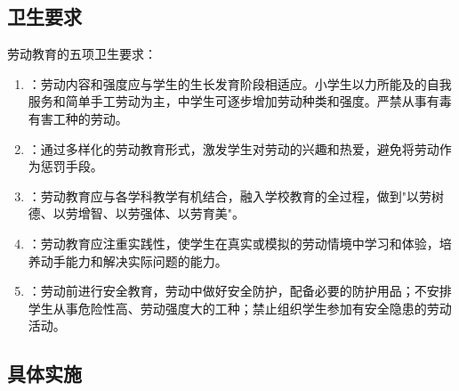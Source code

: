 \subsection{卫生要求}

\begin{keybox}
劳动教育的五项卫生要求：

\begin{enumerate}[leftmargin=*]
    \item {}：劳动内容和强度应与学生的生长发育阶段相适应。小学生以力所能及的自我服务和简单手工劳动为主，中学生可逐步增加劳动种类和强度。严禁从事有毒有害工种的劳动。
    \item {}：通过多样化的劳动教育形式，激发学生对劳动的兴趣和热爱，避免将劳动作为惩罚手段。
    \item {}：劳动教育应与各学科教学有机结合，融入学校教育的全过程，做到"以劳树德、以劳增智、以劳强体、以劳育美"。
    \item {}：劳动教育应注重实践性，使学生在真实或模拟的劳动情境中学习和体验，培养动手能力和解决实际问题的能力。
    \item {}：劳动前进行安全教育，劳动中做好安全防护，配备必要的防护用品；不安排学生从事危险性高、劳动强度大的工种；禁止组织学生参加有安全隐患的劳动活动。
\end{enumerate}
\end{keybox}

\subsection{具体实施}

